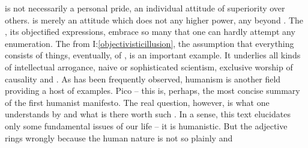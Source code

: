 \pa\label{adpride}  is not necessarily a personal pride, an individual
attitude of superiority over others.   is merely an attitude which
does not  any higher power, any  beyond
.  The , its {objectified} expressions, embrace so
many  that one can hardly attempt any enumeration.  The
 from I:\ref{objectivisticillusion}, the assumption
that everything consists of {things}, eventually, of , is an
important example.  It underlies all kinds of intellectual arrogance, naive or
sophisticated scientism, exclusive worship of causality and .
As has been frequently observed, humanism is another field providing a host of
examples.  \citet{But how can anyone judge or love what he does not
  know?}{Pico}{} -- this is, perhaps, the most concise summary of the first
humanist manifesto. The real question, however, is what one understands by
 and what is there worth such .  In a sense, this text
elucidates only some fundamental issues of our life -- it is humanistic.  But
the adjective rings wrongly because the human nature is not so plainly and
